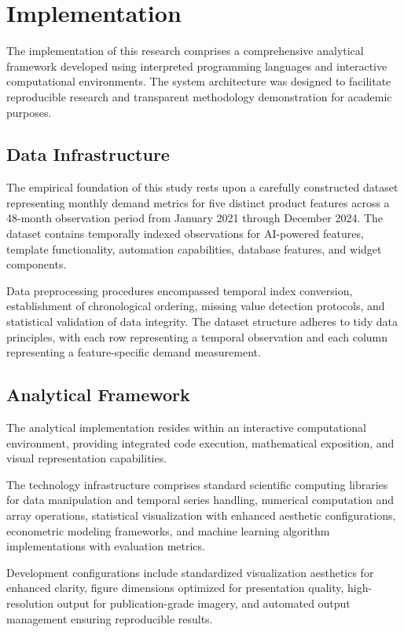 \section{Implementation}

The implementation of this research comprises a comprehensive analytical framework developed using interpreted programming languages and interactive computational environments. The system architecture was designed to facilitate reproducible research and transparent methodology demonstration for academic purposes.

\subsection{Data Infrastructure}
The empirical foundation of this study rests upon a carefully constructed dataset representing monthly demand metrics for five distinct product features across a 48-month observation period from January 2021 through December 2024. The dataset contains temporally indexed observations for AI-powered features, template functionality, automation capabilities, database features, and widget components.

Data preprocessing procedures encompassed temporal index conversion, establishment of chronological ordering, missing value detection protocols, and statistical validation of data integrity. The dataset structure adheres to tidy data principles, with each row representing a temporal observation and each column representing a feature-specific demand measurement.

\subsection{Analytical Framework}
The analytical implementation resides within an interactive computational environment, providing integrated code execution, mathematical exposition, and visual representation capabilities.

The technology infrastructure comprises standard scientific computing libraries for data manipulation and temporal series handling, numerical computation and array operations, statistical visualization with enhanced aesthetic configurations, econometric modeling frameworks, and machine learning algorithm implementations with evaluation metrics.

Development configurations include standardized visualization aesthetics for enhanced clarity, figure dimensions optimized for presentation quality, high-resolution output for publication-grade imagery, and automated output management ensuring reproducible results.

